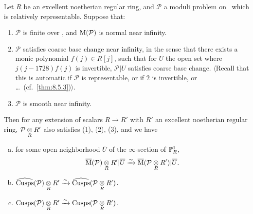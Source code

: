 \begin{kprop}\label{prop:8.6.6}
Let $R$ be an excellent noetherian regular ring, and $\mathcal{P}$ a moduli problem on \EllR\ which is relatively representable. Suppose that:
\begin{enumerate}[(1)]
\item $\mathcal{P}$ is finite over \EllR, and $\mathrm{M}(\mathcal{P})$ is normal near infinity.
\item $\mathcal{P}$ satisfies coarse base change near infinity, in the sense that there exists a monic polynomial $f(j) \in R[j]$, such that for $U$ the open set where $j(j-1728)f(j)$ is invertible, $\mathcal{P}|U$ satisfies coarse base change. $\langle$Recall that this is automatic if $\mathcal{P}$ is representable, or if $2$ is invertible, or \dots\ (cf.\ \ref{thm:8.5.3})$\rangle$.
\item $\mathcal{P}$ is smooth near infinity.
\end{enumerate}
Then for any extension of scalars $R \to R'$ with $R'$ an excellent noetherian regular ring, $\mathcal{P} \underset{R}{\otimes} R'$ also satisfies (1), (2), (3), and we have
\begin{enumerate}[(a)]
\item for some open neighborhood $\overline{U}$ of the $\infty$-section of $\mathbb{P}^1_R$,
\[
\overline{\mathrm{M}}(\mathcal{P}) \underset{R}{\otimes} R' | \overline{U} \xrightarrow{\sim} \overline{\mathrm{M}}(\mathcal{P} \underset{R}{\otimes} R') | \overline{U} .
\]
\nopagebreak
\item $\widehat{\mathrm{Cusps}}(\mathcal{P}) \underset{R}{\otimes} R' \xrightarrow{\sim} \widehat{\mathrm{Cusps}}(\mathcal{P} \underset{R}{\otimes} R')$.
\nopagebreak
\item $\mathrm{Cusps}(\mathcal{P}) \underset{R}{\otimes} R' \xrightarrow{\sim} \mathrm{Cusps}(\mathcal{P} \underset{R}{\otimes} R')$.
\end{enumerate}
\end{kprop}

